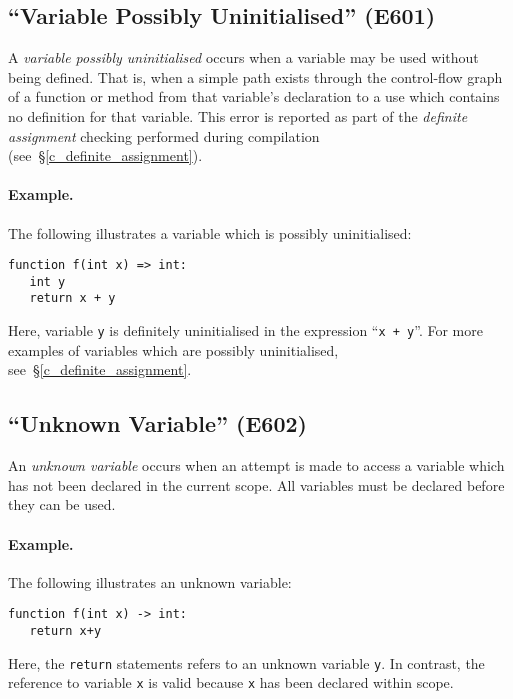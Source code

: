 \subsection{``Variable Possibly Uninitialised'' (E601)}
\label{c_err_var_uninitialised}
A {\em variable possibly uninitialised} occurs when a variable may be used without being defined.  That is, when a simple path exists through the control-flow graph of a function or method from that variable's declaration to a use which contains no definition for that variable.  This error is reported as part of the {\em definite assignment} checking performed during compilation (see~\S\ref{c_definite_assignment}).

\paragraph{Example.}  The following illustrates a variable which is possibly uninitialised:

\begin{lstlisting}
function f(int x) => int:
   int y
   return x + y
\end{lstlisting}

Here, variable \lstinline{y} is definitely uninitialised in the expression ``\lstinline{x + y}''.  For more examples of variables which are possibly uninitialised, see~\S\ref{c_definite_assignment}.

\subsection{``Unknown Variable'' (E602)}

An {\em unknown variable} occurs when an attempt is made to access a variable which has not been declared in the current scope.  All variables must be declared before they can be used.

\paragraph{Example.}  The following illustrates an unknown variable:

\begin{lstlisting}
function f(int x) -> int:
   return x+y
\end{lstlisting}

Here, the \lstinline{return} statements refers to an unknown variable \lstinline{y}.  In contrast, the reference to variable \lstinline{x} is valid because \lstinline{x} has been declared within scope.

